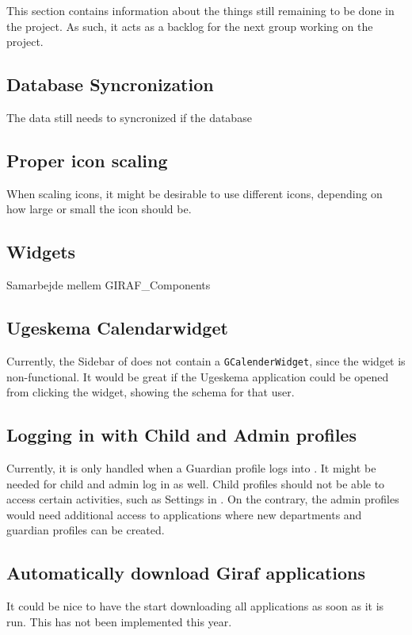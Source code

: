 This section contains information about the things still remaining to be done in the \launcher project.
As such, it acts as a backlog for the next group working on the project.

\subsection{Database Syncronization}
The data still needs to syncronized if the database

\subsection{Proper icon scaling}
When scaling icons, it might be desirable to use different icons, depending on how large or small the icon should be.

\subsection{Widgets}
Samarbejde mellem GIRAF\_Components

\subsection{Ugeskema Calendarwidget}
Currently, the Sidebar of \launcher does not contain a \lstinline!GCalenderWidget!, since the widget is non-functional.
It would be great if the Ugeskema application could be opened from clicking the widget, showing the schema for that user.

\subsection{Logging in with Child and Admin profiles}
Currently, it is only handled when a Guardian profile logs into \launcher.
It might be needed for child and admin log in as well.
Child profiles should not be able to access certain activities, such as Settings in \launcher.
On the contrary, the admin profiles would need additional access to applications where new departments and guardian profiles can be created.

\subsection{Automatically download Giraf applications}
It could be nice to have the \launcher start downloading all \giraf applications as soon as it is run.
This has not been implemented this year.

